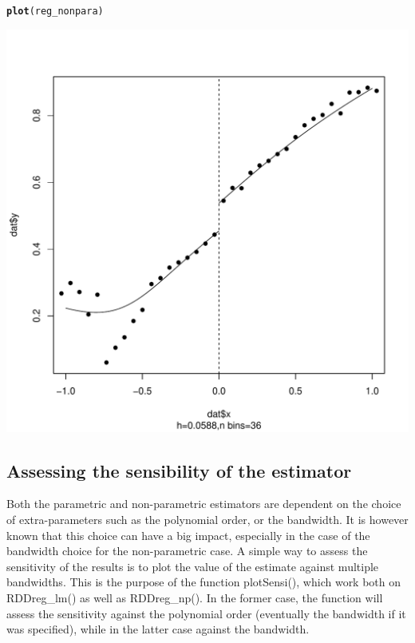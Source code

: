 \documentclass[english,nojss]{jss}\usepackage{graphicx, color}
\makeatletter
\def\maxwidth{ %
  \ifdim\Gin@nat@width>\linewidth
    \linewidth
  \else
    \Gin@nat@width
  \fi
}
\newcommand{\hlfunctioncall}[1]{\textcolor[rgb]{0.501960784313725,0,0.329411764705882}{\textbf{#1}}}%
\newenvironment{kframe}{%
 \def\at@end@of@kframe{}%
 \ifinner\ifhmode%
  \def\at@end@of@kframe{\end{minipage}}%
  \begin{minipage}{\columnwidth}%
 \fi\fi%
 \def\FrameCommand##1{\hskip\@totalleftmargin \hskip-\fboxsep
 \colorbox{shadecolor}{##1}\hskip-\fboxsep
     \hskip-\linewidth \hskip-\@totalleftmargin \hskip\columnwidth}%
 \MakeFramed {\advance\hsize-\width
   \@totalleftmargin\z@ \linewidth\hsize
   \@setminipage}}%
 {\par\unskip\endMakeFramed%
 \at@end@of@kframe}
\newenvironment{knitrout}{}{} %
\makeatother
\begin{document}
\begin{knitrout}
\color{fgcolor}\begin{kframe}
\begin{alltt}
\hlfunctioncall{plot}(reg_nonpara)
\end{alltt}


{\ttfamily\noindent\color{warningcolor}{\#\# Warning: font width unknown for character 0x9}}\end{kframe}
\includegraphics[width=\maxwidth]{figure/unnamed-chunk-12} 

\end{knitrout}



\subsection{Assessing the sensibility of the estimator}

Both the parametric and non-parametric estimators are dependent on
the choice of extra-parameters such as the polynomial order, or the
bandwidth. It is however known that this choice can have a big impact,
especially in the case of the bandwidth choice for the non-parametric
case. A simple way to assess the sensitivity of the results is to
plot the value of the estimate against multiple bandwidths. This is
the purpose of the function plotSensi(), which work both on RDDreg\_lm()
as well as RDDreg\_np(). In the former case, the function will assess
the sensitivity against the polynomial order (eventually the bandwidth
if it was specified), while in the latter case against the bandwidth. 
\end{document}
